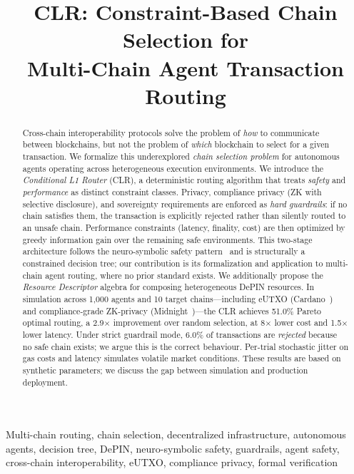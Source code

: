 \documentclass[conference, 10pt, twocolumn]{IEEEtran}
\title{CLR: Constraint-Based Chain Selection for\\
Multi-Chain Agent Transaction Routing}
\author{
  \IEEEauthorblockN{Aseem Chishti}
  \IEEEauthorblockA{
    VAMS Protocol\\
    Email: aseeminksa@gmail.com\\
    ORCID: 0000-0000-0000-0000
  }
}
\begin{document}
\maketitle

\begin{abstract}
Cross-chain interoperability protocols solve the problem of \emph{how}
to communicate between blockchains, but not the problem of \emph{which}
blockchain to select for a given transaction.  We formalize this
underexplored \emph{chain selection problem} for autonomous agents
operating across heterogeneous execution environments.  We introduce
the \emph{Conditional L1 Router} (CLR), a deterministic routing
algorithm that treats \emph{safety} and \emph{performance} as
distinct constraint classes.  Privacy, compliance privacy (ZK with
selective disclosure), and sovereignty requirements are enforced as
\emph{hard guardrails}: if no chain satisfies them, the transaction is
explicitly rejected rather than silently routed to an unsafe chain.
Performance constraints (latency, finality, cost) are then optimized
by greedy information gain over the remaining safe environments.  This
two-stage architecture follows the neuro-symbolic safety
pattern~\cite{garcez2023neurosymbolic} and is structurally a
constrained decision tree; our contribution is its formalization and
application to multi-chain agent routing, where no prior standard
exists.  We additionally propose the \emph{Resource Descriptor} algebra
for composing heterogeneous DePIN resources.  In simulation across
1{,}000 agents and 10 target chains---including eUTXO
(Cardano~\cite{cardano2020ouroboros}) and compliance-grade
ZK-privacy (Midnight~\cite{midnight2024})---the CLR achieves 51.0\%
Pareto optimal routing, a 2.9$\times$ improvement over random
selection, at 8$\times$ lower cost and 1.5$\times$ lower latency.
Under strict guardrail mode, 6.0\% of transactions are
\emph{rejected} because no safe chain exists; we argue this is the
correct behaviour.  Per-trial stochastic jitter on gas costs and
latency simulates volatile market conditions.  These results are based
on synthetic parameters; we discuss the gap between simulation and
production deployment.
\end{abstract}

\begin{IEEEkeywords}
Multi-chain routing, chain selection, decentralized infrastructure,
autonomous agents, decision tree, DePIN, neuro-symbolic safety,
guardrails, agent safety, cross-chain interoperability, eUTXO,
compliance privacy, formal verification
\end{IEEEkeywords}
\end{document}
